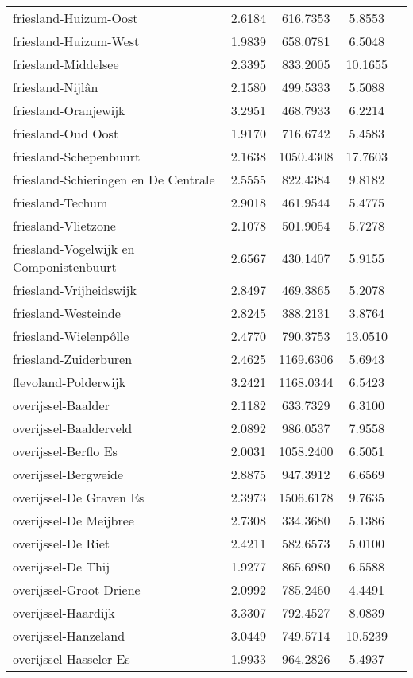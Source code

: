 \begin{longtable}{llccc}
friesland-Huizum-Oost & 2.6184 & 616.7353 & 5.8553 \\
friesland-Huizum-West & 1.9839 & 658.0781 & 6.5048 \\
friesland-Middelsee & 2.3395 & 833.2005 & 10.1655 \\
friesland-Nijlân & 2.1580 & 499.5333 & 5.5088 \\
friesland-Oranjewijk & 3.2951 & 468.7933 & 6.2214 \\
friesland-Oud Oost & 1.9170 & 716.6742 & 5.4583 \\
friesland-Schepenbuurt & 2.1638 & 1050.4308 & 17.7603 \\
friesland-Schieringen en De Centrale & 2.5555 & 822.4384 & 9.8182 \\
friesland-Techum & 2.9018 & 461.9544 & 5.4775 \\
friesland-Vlietzone & 2.1078 & 501.9054 & 5.7278 \\
friesland-Vogelwijk en Componistenbuurt & 2.6567 & 430.1407 & 5.9155 \\
friesland-Vrijheidswijk & 2.8497 & 469.3865 & 5.2078 \\
friesland-Westeinde & 2.8245 & 388.2131 & 3.8764 \\
friesland-Wielenpôlle & 2.4770 & 790.3753 & 13.0510 \\
friesland-Zuiderburen & 2.4625 & 1169.6306 & 5.6943 \\
flevoland-Polderwijk & 3.2421 & 1168.0344 & 6.5423 \\
overijssel-Baalder & 2.1182 & 633.7329 & 6.3100 \\
overijssel-Baalderveld & 2.0892 & 986.0537 & 7.9558 \\
overijssel-Berflo Es & 2.0031 & 1058.2400 & 6.5051 \\
overijssel-Bergweide & 2.8875 & 947.3912 & 6.6569 \\
overijssel-De Graven Es & 2.3973 & 1506.6178 & 9.7635 \\
overijssel-De Meijbree & 2.7308 & 334.3680 & 5.1386 \\
overijssel-De Riet & 2.4211 & 582.6573 & 5.0100 \\
overijssel-De Thij & 1.9277 & 865.6980 & 6.5588 \\
overijssel-Groot Driene & 2.0992 & 785.2460 & 4.4491 \\
overijssel-Haardijk & 3.3307 & 792.4527 & 8.0839 \\
overijssel-Hanzeland & 3.0449 & 749.5714 & 10.5239 \\
overijssel-Hasseler Es & 1.9933 & 964.2826 & 5.4937 \\

\end{longtable}
